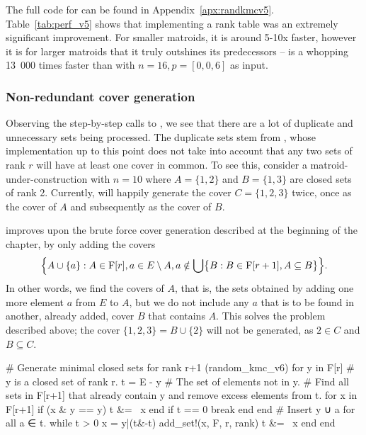 The full code for  can be found in Appendix~\ref{apx:randkmcv5}. Table~\ref{tab:perf_v5} shows that implementing a rank table was an extremely significant improvement. For smaller matroids, it is around 5-10x faster, however it is for larger matroids that it truly outshines its predecessors --  is a whopping 13~000 times faster than  with $n=16, p=[0,0,6]$ as input.


\subsubsection{Non-redundant cover generation}
Observing the step-by-step calls to , we see that there are a lot of duplicate and unnecessary sets being processed. The duplicate sets stem from , whose implementation up to this point does not take into account that any two sets of rank $r$ will have at least one cover in common. To see this, consider a matroid-under-construction with $n=10$ where $A = \{1,2\}$ and $B = \{1,3\}$ are closed sets of rank 2. Currently,  will happily generate the cover $C=\{1,2,3\}$ twice, once as the cover of $A$ and subsequently as the cover of $B$. 

 improves upon the brute force cover generation described at the beginning of the chapter, by only adding the covers 
$$\Bigl\{ A \cup \{ a \} : A \in \mathrm{F}[r], a \in E \setminus A, a \notin \bigcup \bigl\{ B : B \in \mathrm{F}[r+1], A \subseteq B \bigr\} \Bigr\}.$$
In other words, we find the covers of $A$, that is, the sets obtained by adding one more element $a$ from $E$ to $A$, but we do not include any $a$ that is to be found in another, already added, cover $B$ that contains $A$. This solves the problem described above; the cover $\{1,2,3\} = B \cup \{ 2 \}$ will not be generated, as $2 \in C$ and $B \subseteq C$.

\begin{jllisting}
  # Generate minimal closed sets for rank r+1 (random_kmc_v6)
  for y in F[r] # y is a closed set of rank r.
    t = E - y # The set of elements not in y.
    # Find all sets in F[r+1] that already contain y and remove excess elements from t.
    for x in F[r+1]
      if (x & y == y) t &= ~x end
      if t == 0 break end
    end
    # Insert y ∪ a for all a ∈ t.
    while t > 0
      x = y|(t&-t)
      add_set!(x, F, r, rank)
      t &= ~x
    end
  end
\end{jllisting}

